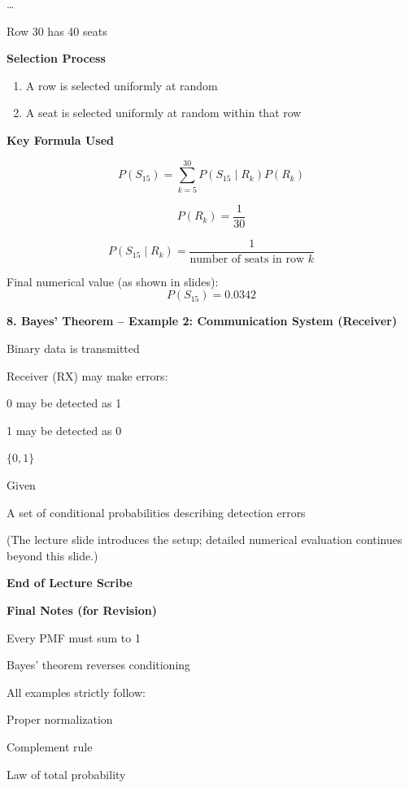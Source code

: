 \documentclass[12pt]{article}
\begin{document}
\ldots

Row 30 has 40 seats

\textbf{Selection Process}

\begin{enumerate}[leftmargin=2em]
\item A row is selected uniformly at random
\item A seat is selected uniformly at random within that row
\end{enumerate}

\textbf{Key Formula Used}

\[
P(S_{15}) = \sum_{k=5}^{30} P(S_{15} \mid R_k)P(R_k)
\]

\[
P(R_k) = \frac{1}{30}
\]

\[
P(S_{15} \mid R_k) =
\frac{1}{\text{number of seats in row } k}
\]

Final numerical value (as shown in slides):
\[
P(S_{15}) = 0.0342
\]

\vspace{0.5em}

\textbf{8. Bayes’ Theorem – Example 2: Communication System (Receiver)}

Binary data is transmitted

Receiver (RX) may make errors:

0 may be detected as 1

1 may be detected as 0

$\{0,1\}$

Given

A set of conditional probabilities describing detection errors

(The lecture slide introduces the setup; detailed numerical evaluation continues beyond this slide.)

\vspace{1em}

\textbf{End of Lecture Scribe}

\vspace{0.5em}

\textbf{Final Notes (for Revision)}

Every PMF must sum to 1

Bayes’ theorem reverses conditioning

All examples strictly follow:

Proper normalization

Complement rule

Law of total probability
\end{document}
